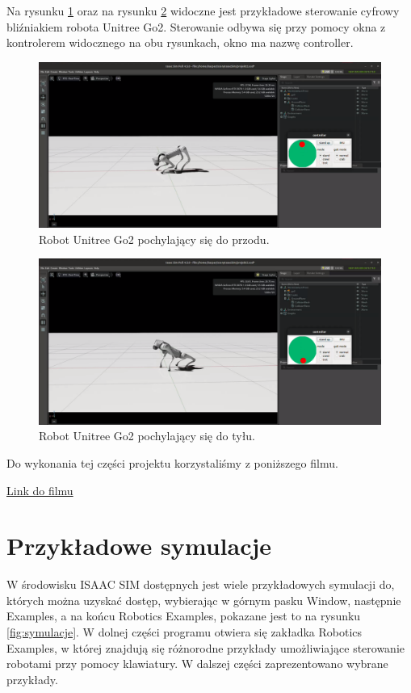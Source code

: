 \documentclass[12pt]{article}
\begin{document}
 
Na rysunku \ref{fig:pochyleniePrzod} oraz na rysunku \ref{fig:pochylenieTyl} widoczne jest przykładowe sterowanie cyfrowy bliźniakiem robota Unitree Go2. Sterowanie odbywa się przy pomocy okna z kontrolerem widocznego na obu rysunkach, okno ma nazwę controller.



\begin{figure}[h]
    \centering
    \includegraphics[width=0.75\linewidth]{Zdjęcia/pochyleniePrzod.png}
    \caption{Robot Unitree Go2 pochylający się do przodu.}
    \label{fig:pochyleniePrzod}
\end{figure}

\begin{figure}[h]
    \centering
    \includegraphics[width=0.75\linewidth]{Zdjęcia/pochylenieTyl.png}
    \caption{Robot Unitree Go2 pochylający się do tyłu.}
    \label{fig:pochylenieTyl}
\end{figure}

Do wykonania tej części projektu korzystaliśmy z poniższego filmu.

\href{https://www.youtube.com/watch?v=L1rpxRm0Q1w&t=581s}{Link do filmu}

\clearpage

\section{Przykładowe symulacje}

W środowisku ISAAC SIM dostępnych jest wiele przykładowych symulacji do, których można uzyskać dostęp, wybierając w górnym pasku Window, następnie Examples, a na końcu Robotics Examples, pokazane jest to na rysunku \ref{fig:symulacje}.
W dolnej części programu otwiera się zakładka Robotics Examples, w której znajdują się różnorodne przykłady umożliwiające sterowanie robotami przy pomocy klawiatury. W dalszej części zaprezentowano wybrane przykłady.
\end{document}
